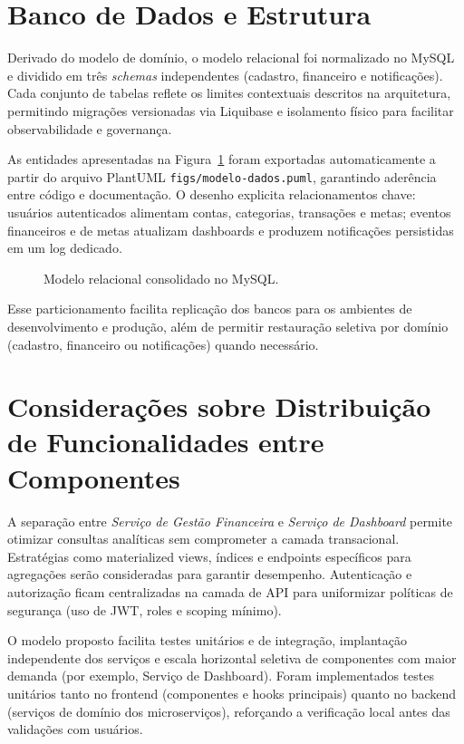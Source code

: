 \section{Banco de Dados e Estrutura}
\label{sec:banco-dados}

Derivado do modelo de domínio, o modelo relacional foi normalizado no MySQL e dividido em três \textit{schemas} independentes (cadastro, financeiro e notificações). Cada conjunto de tabelas reflete os limites contextuais descritos na arquitetura, permitindo migrações versionadas via Liquibase e isolamento físico para facilitar observabilidade e governança.

As entidades apresentadas na Figura~\ref{fig:esquema-banco} foram exportadas automaticamente a partir do arquivo PlantUML \texttt{figs/modelo-dados.puml}, garantindo aderência entre código e documentação. O desenho explicita relacionamentos chave: usuários autenticados alimentam contas, categorias, transações e metas; eventos financeiros e de metas atualizam dashboards e produzem notificações persistidas em um log dedicado.

\begin{figure}[H]
\centering
{}
\caption{Modelo relacional consolidado no MySQL.}
\label{fig:esquema-banco}
\end{figure}

Esse particionamento facilita replicação dos bancos para os ambientes de desenvolvimento e produção, além de permitir restauração seletiva por domínio (cadastro, financeiro ou notificações) quando necessário.

\section{Considerações sobre Distribuição de Funcionalidades entre Componentes}

A separação entre \textit{Serviço de Gestão Financeira} e \textit{Serviço de Dashboard} permite otimizar consultas analíticas sem comprometer a camada transacional. Estratégias como materialized views, índices e endpoints específicos para agregações serão consideradas para garantir desempenho. Autenticação e autorização ficam centralizadas na camada de API para uniformizar políticas de segurança (uso de JWT, roles e scoping mínimo).

O modelo proposto facilita testes unitários e de integração, implantação independente dos serviços e escala horizontal seletiva de componentes com maior demanda (por exemplo, Serviço de Dashboard). Foram implementados testes unitários tanto no frontend (componentes e hooks principais) quanto no backend (serviços de domínio dos microserviços), reforçando a verificação local antes das validações com usuários.
